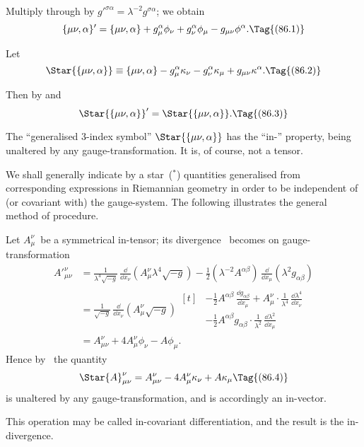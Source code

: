 \documentclass[12pt]{book}
\begin{document}
Multiply through by ${g'}^{\sigma\alpha} = \lambda^{-2} g^{\sigma\alpha}$; we obtain
\[
\{\mu\nu, \alpha\}'
= \{\mu\nu, \alpha\} + g_{\mu}^{\alpha} \phi_{\nu} + g_{\nu}^{\alpha} \phi_{\mu} - g_{\mu\nu} \phi^{\alpha}.
\Tag{(86.1)}
\]

Let
\[
\Star{\{\mu\nu, \alpha\}}
\equiv \{\mu\nu, \alpha\} - g_{\mu}^{\alpha} \kappa_{\nu} - g_{\nu}^{\alpha} \kappa_{\mu} + g_{\mu\nu} \kappa^{\alpha}.
\Tag{(86.2)}
\]

Then by  and~
\[
\Star{\{\mu\nu, \alpha\}}' = \Star{\{\mu\nu, \alpha\}}.
\Tag{(86.3)}
\]

The ``generalised $3$-index symbol'' $\Star{\{\mu\nu, \alpha\}}$ has the ``in-'' property, being
unaltered by any gauge\hyp{}transformation. It is, of course, not a tensor.

We shall generally indicate by a star~(${}^{*}$) quantities generalised from corresponding
expressions in Riemannian geometry in order to be independent of
(or covariant with) the gauge\hyp{}system. The following illustrates the general
method of procedure.

Let $A_{\mu}^{\nu}$~be a symmetrical in\hyp{}tensor; its divergence~ becomes on
gauge\hyp{}transformation
\begin{align*}
  {A'}_{\mu\nu}^{\nu}
  &= \frac{1}{\lambda^{4} \sqrt{-g}}\, \frac{\dd}{\dd x_{\nu}} (A_{\mu}^{\nu} \lambda^{4} \sqrt{-g})
  - \tfrac{1}{2} (\lambda^{-2} A^{\alpha\beta})\, \frac{\dd}{\dd x_{\mu}} (\lambda^2 g_{\alpha\beta}) \\
  &= \frac{1}{\sqrt{-g}}\, \frac{\dd}{\dd x_{\nu}} (A_{\mu}^{\nu}\sqrt{-g})
  \begin{aligned}[t]
    &- \tfrac{1}{2} A^{\alpha\beta}\, \frac{\dd g_{\alpha\beta}}{\dd x_{\mu}}
    + A_{\mu}^{\nu} \cdot \frac{1}{\lambda^{4}}\, \frac{\dd\lambda^{4}}{\dd x_{\nu}} \\
    &- \tfrac{1}{2} A^{\alpha\beta} g_{\alpha\beta} \cdot \frac{1}{\lambda^2}\, \frac{\dd\lambda^2}{\dd x_{\mu}}
  \end{aligned} \\
  &= A_{\mu\nu}^{\nu} + 4A_{\mu}^{\nu} \phi_{\nu} - A\phi_{\mu}.
\end{align*}
Hence by~ the quantity
\[
\Star{A}_{\mu\nu}^{\nu} = A_{\mu\nu}^{\nu} - 4A_{\mu}^{\nu} \kappa_{\nu} + A\kappa_{\mu}
\Tag{(86.4)}
\]
is unaltered by any gauge\hyp{}transformation, and is accordingly an in\hyp{}vector.

This operation may be called in\hyp{}covariant differentiation, and the result is
the in\hyp{}divergence.
\end{document}
